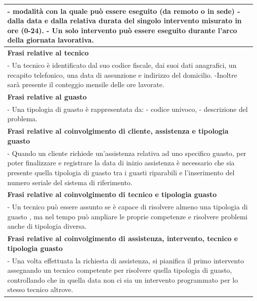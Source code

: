 \documentclass[legalpaper]{article}
\begin{document}
\begin{tabular}{ |p{16 cm}| }
- modalità con la quale può essere eseguito (da remoto o in sede)\newline
- dalla data e dalla relativa durata del singolo intervento misurato in ore (0-24). \newline 
- Un solo intervento può essere eseguito durante l'arco della giornata lavorativa.\\
\hline
\textbf{Frasi relative al tecnico}  \\
\hline
- Un tecnico è identificato dal suo codice fiscale, dai suoi dati anagrafici, un recapito telefonico, una data di assunzione e indirizzo del domicilio.\newline
-Inoltre sarà presente il conteggio mensile delle ore lavorate.
\\
\hline
\textbf{Frasi relative al guasto}  \\
\hline
- Una tipologia di guasto è rappresentata da: \newline
- codice univoco, \newline
- descrizione del problema.\\
\hline
\textbf{Frasi relative al coinvolgimento di cliente, assistenza e tipologia guasto}  \\
\hline
- Quando un cliente richiede un'assistenza relativa ad uno specifico guasto, per poter finalizzare e registrare la data di inizio assistenza è necessario che sia presente quella tipologia di guasto tra i guasti riparabili e l'inserimento del numero seriale del sistema di riferimento.\\
\hline
\textbf{Frasi relative al coinvolgimento di tecnico e tipologia guasto}  \\
\hline
- Un tecnico può essere assunto se è capace di risolvere almeno una tipologia di guasto , ma nel tempo può ampliare le proprie competenze e risolvere problemi anche di tipologia diversa.\\
\hline

\textbf{Frasi relative al coinvolgimento di assistenza, intervento, tecnico e tipologia guasto}  \\
\hline
- Una volta effettuata la richiesta di assistenza, si pianifica il primo intervento assegnando un tecnico competente per risolvere quella tipologia di guasto, controllando che in quella data non ci sia un intervento programmato per lo stesso tecnico altrove.\\
\hline
\end{tabular}
\newpage
\end{document}
